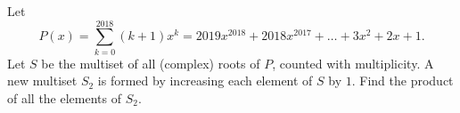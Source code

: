 Let
\[
P(x)=\sum_{k=0}^{2018}(k+1)x^k=2019x^{2018}+2018x^{2017}+\dots+3x^2+2x+1 .
\]
Let $S$ be the multiset of all (complex) roots of $P$, counted with multiplicity. A new multiset $S_2$ is formed by increasing each element of $S$ by $1$. Find the product of all the elements of $S_2$.
